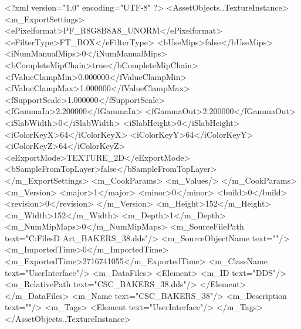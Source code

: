 <?xml version="1.0" encoding="UTF-8" ?>
<AssetObjects..TextureInstance>
	<m_ExportSettings>
		<ePixelformat>PF_R8G8B8A8_UNORM</ePixelformat>
		<eFilterType>FT_BOX</eFilterType>
		<bUseMips>false</bUseMips>
		<iNumManualMips>0</iNumManualMips>
		<bCompleteMipChain>true</bCompleteMipChain>
		<fValueClampMin>0.000000</fValueClampMin>
		<fValueClampMax>1.000000</fValueClampMax>
		<fSupportScale>1.000000</fSupportScale>
		<fGammaIn>2.200000</fGammaIn>
		<fGammaOut>2.200000</fGammaOut>
		<iSlabWidth>0</iSlabWidth>
		<iSlabHeight>0</iSlabHeight>
		<iColorKeyX>64</iColorKeyX>
		<iColorKeyY>64</iColorKeyY>
		<iColorKeyZ>64</iColorKeyZ>
		<eExportMode>TEXTURE_2D</eExportMode>
		<bSampleFromTopLayer>false</bSampleFromTopLayer>
	</m_ExportSettings>
	<m_CookParams>
		<m_Values/>
	</m_CookParams>
	<m_Version>
		<major>1</major>
		<minor>0</minor>
		<build>0</build>
		<revision>0</revision>
	</m_Version>
	<m_Height>152</m_Height>
	<m_Width>152</m_Width>
	<m_Depth>1</m_Depth>
	<m_NumMipMaps>0</m_NumMipMaps>
	<m_SourceFilePath text="C:\Users\Shadow\Desktop\Working Files\2D Art\Quarters\Bakers\CSC_BAKERS_38.dds"/>
	<m_SourceObjectName text=""/>
	<m_ImportedTime>0</m_ImportedTime>
	<m_ExportedTime>2716741055</m_ExportedTime>
	<m_ClassName text="UserInterface"/>
	<m_DataFiles>
		<Element>
			<m_ID text="DDS"/>
			<m_RelativePath text="CSC_BAKERS_38.dds"/>
		</Element>
	</m_DataFiles>
	<m_Name text="CSC_BAKERS_38"/>
	<m_Description text=""/>
	<m_Tags>
		<Element text="UserInterface"/>
	</m_Tags>
</AssetObjects..TextureInstance>

